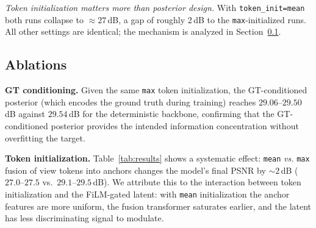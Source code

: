 \emph{Token initialization matters more than posterior design.} With
\texttt{token\_init\allowbreak=mean} both runs collapse to
$\approx 27$\,dB, a gap of roughly 2\,dB to the \texttt{max}-initialized
runs. All other settings are identical; the mechanism is analyzed in
Section~\ref{sec:exp:ablation}.

\subsection{Ablations}
\label{sec:exp:ablation}

\textbf{GT conditioning.}
Given the same \texttt{max} token initialization, the GT-conditioned
posterior (which encodes the ground truth during training) reaches
$29.06$--$29.50$\,dB against $29.54$\,dB for the deterministic
backbone, confirming that the GT-conditioned posterior provides the
intended information concentration without overfitting the target.

\textbf{Token initialization.}
Table~\ref{tab:results} shows a systematic effect:
\texttt{mean} \emph{vs.} \texttt{max} fusion of view tokens into
anchors changes the model's final PSNR by $\sim\!2$\,dB ($27.0$--$27.5$ vs.\
$29.1$--$29.5$\,dB). We attribute this to the interaction between token
initialization and the FiLM-gated latent: with \texttt{mean}
initialization the anchor features are more uniform, the fusion
transformer saturates earlier, and the latent has less discriminating
signal to modulate.